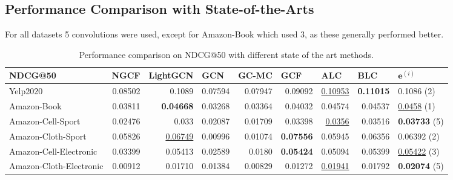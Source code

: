 \subsection{Performance Comparison with State-of-the-Arts}
For all datasets 5 convolutions were used, except for Amazon-Book which used 3, as these generally performed better.


\begin{table*}[] %
    \centering  %
    \begin{tabular}{|l|r|r|r|r|r||r|r|l|}
        \hline
        NDCG@50                 & \multicolumn{1}{l|}{NGCF} & \multicolumn{1}{l|}{LightGCN} & \multicolumn{1}{l|}{GCN} & \multicolumn{1}{l|}{GC-MC} & \multicolumn{1}{l||}{GCF} & \multicolumn{1}{l|}{ALC} & \multicolumn{1}{l|}{BLC} & $\mathbf{e}^{(i)}$   \\ \hline
        Yelp2020                & 0.08502                   & 0.1089                        & 0.07594                  & 0.07947                    & 0.09092                   & \underline{0.10953}      & \textbf{0.11015}         & 0.1086 (2)  \\ \hline
        Amazon-Book             & 0.03811                   & \textbf{0.04668}              & 0.03268                  & 0.03364                    & 0.04032                   & 0.04574                  & 0.04537                  & \underline{0.0458} (1)  \\ \hline
        Amazon-Cell-Sport       & 0.02476                   & 0.033                         & 0.02087                  & 0.01709                    & 0.03398                   & \underline{0.0356}       & 0.03516                  & \textbf{0.03733} (5) \\ \hline
        Amazon-Cloth-Sport      & 0.05826                   & \underline{0.06749}           & 0.00996                  & 0.01074                    & \textbf{0.07556}          & 0.05945                  & 0.06356                  & 0.06392 (2) \\ \hline
        Amazon-Cell-Electronic  & 0.03399                   & 0.05413                       & 0.02589                  & 0.0180                     & \textbf{0.05424}          & 0.05094                  & 0.05399                  & \underline{0.05422} (3) \\ \hline
        Amazon-Cloth-Electronic & 0.00912                   & 0.01710                       & 0.01384                  & 0.00829                    & 0.01272                   & \underline{0.01941}      & 0.01792                  & \textbf{0.02074} (5) \\ \hline
    \end{tabular}
    \caption{Performance comparison on NDCG@50 with different state of the art methods.}
    \label{tab:baselines-ndcg}
\end{table*}

